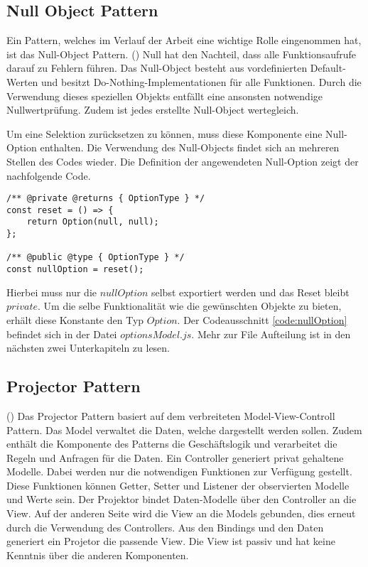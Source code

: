 \subsection{Null Object Pattern}

Ein Pattern, welches im Verlauf der Arbeit eine wichtige Rolle eingenommen hat, ist das Null-Object Pattern.
(\cite{nullObjectPattern}) Null hat den Nachteil, dass alle Funktionsaufrufe darauf zu Fehlern führen.
Das Null-Object besteht aus vordefinierten Default-Werten und besitzt Do-Nothing-Implementationen für alle Funktionen.
Durch die Verwendung dieses speziellen Objekts entfällt eine ansonsten notwendige Nullwertprüfung.
Zudem ist jedes erstellte Null-Object wertegleich.

Um eine Selektion zurücksetzen zu können, muss diese Komponente eine Null-Option enthalten.
Die Verwendung des Null-Objects findet sich an mehreren Stellen des Codes wieder.
Die Definition der angewendeten Null-Option zeigt der nachfolgende Code.

\begin{lstlisting}[style = htmlcssjs, caption = Null-Option, label = code:nullOption]
/** @private @returns { OptionType } */
const reset = () => {
    return Option(null, null);
};

/** @public @type { OptionType } */
const nullOption = reset();
\end{lstlisting}

Hierbei muss nur die $nullOption$ selbst exportiert werden und das Reset bleibt $private$.
Um die selbe Funktionalität wie die gewünschten Objekte zu bieten, erhält diese Konstante den Typ $Option$.
Der Codeausschnitt \ref{code:nullOption} befindet sich in der Datei $optionsModel.js$.
Mehr zur File Aufteilung ist in den nächsten zwei Unterkapiteln zu lesen.

\subsection{Projector Pattern}
(\cite{projectorPattern}) Das Projector Pattern basiert auf dem verbreiteten Model-View-Controll Pattern.
Das Model verwaltet die Daten, welche dargestellt werden sollen.
Zudem enthält die Komponente des Patterns die Geschäftslogik und verarbeitet die Regeln und Anfragen für die Daten.
Ein Controller generiert privat gehaltene Modelle.
Dabei werden nur die notwendigen Funktionen zur Verfügung gestellt.
Diese Funktionen können Getter, Setter und Listener der observierten Modelle und Werte sein.
Der Projektor bindet Daten-Modelle über den Controller an die View.
Auf der anderen Seite wird die View an die Models gebunden, dies erneut durch die Verwendung des Controllers.
Aus den Bindings und den Daten generiert ein Projetor die passende View.
Die View ist passiv und hat keine Kenntnis über die anderen Komponenten.

